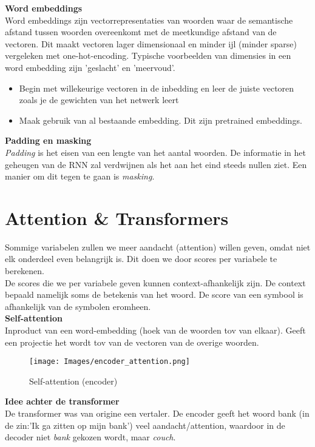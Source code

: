 {\textbf{Word embeddings}\\
Word embeddings zijn vectorrepresentaties van woorden waar de semantische afstand tussen woorden overeenkomt met de meetkundige afstand van de vectoren. Dit maakt vectoren lager dimensionaal en minder ijl (minder sparse) vergeleken met one-hot-encoding. Typische voorbeelden van dimensies in een word embedding zijn 'geslacht' en 'meervoud'.
\begin{itemize}
    \item Begin met willekeurige vectoren in de inbedding en leer de juiste vectoren zoals je de gewichten van het netwerk leert
    \item Maak gebruik van al bestaande embedding. Dit zijn pretrained embeddings.
\end{itemize}

\textbf{Padding en masking}\\
\textit{Padding} is het eisen van een lengte van het aantal woorden. De informatie in het geheugen van de RNN zal verdwijnen als het aan het eind steeds nullen ziet. Een manier om dit tegen te gaan is \textit{masking}.\\

\section{Attention \& Transformers}
Sommige variabelen zullen we meer aandacht (attention) willen geven, omdat niet elk onderdeel even belangrijk is. Dit doen we door scores per variabele te berekenen.\\

\noindent De scores die we per variabele geven kunnen context-afhankelijk zijn. De context bepaald namelijk soms de betekenis van het woord. De score van een symbool is afhankelijk van de symbolen eromheen.\\

\textbf{Self-attention}\\
Inproduct van een word-embedding (hoek van de woorden tov van elkaar). Geeft een projectie het wordt tov van de vectoren van de overige woorden.

\begin{figure}[h]
    \centering
    \texttt{[image: Images/encoder\_attention.png]}
    \caption{Self-attention (encoder)}
    \label{fig:selfattention}
\end{figure}

\textbf{Idee achter de transformer}\\
De transformer was van origine een vertaler. De encoder geeft het woord bank (in de zin:'Ik ga zitten op mijn bank') veel aandacht/attention, waardoor in de decoder niet \textit{bank} gekozen wordt, maar \textit{couch}.\\

}
